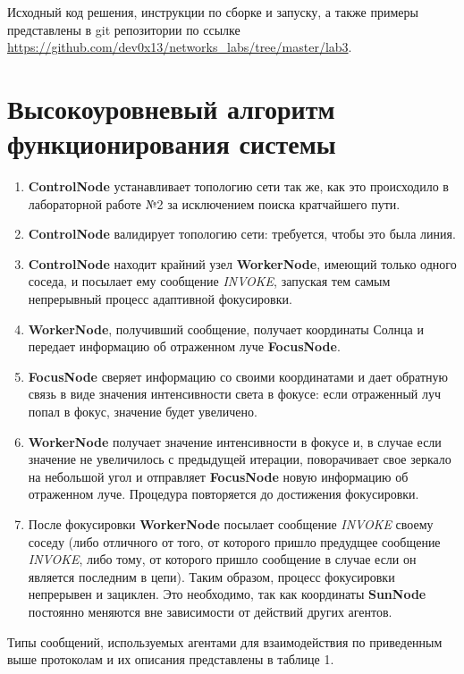 \documentclass{report}
\begin{document}
Исходный код решения, инструкции по сборке и запуску, а также примеры представлены в git репозитории по ссылке \url{https://github.com/dev0x13/networks_labs/tree/master/lab3}.

\section{Высокоуровневый алгоритм функционирования системы}
\begin{enumerate}
    \item {\bf ControlNode} устанавливает топологию сети так же, как это происходило в лабораторной работе №2 за исключением поиска кратчайшего пути.
    \item {\bf ControlNode} валидирует топологию сети: требуется, чтобы это была линия.
    \item {\bf ControlNode} находит крайний узел {\bf WorkerNode}, имеющий только одного соседа, и посылает ему сообщение {\it INVOKE}, запуская тем самым непрерывный процесс адаптивной фокусировки.
    \item {\bf WorkerNode}, получивший сообщение, получает координаты Солнца и передает информацию об отраженном луче {\bf FocusNode}.
    \item {\bf FocusNode} сверяет информацию со своими координатами и дает обратную связь в виде значения интенсивности света в фокусе: если отраженный луч попал в фокус, значение будет увеличено.
    \item {\bf WorkerNode} получает значение интенсивности в фокусе и, в случае если значение не увеличилось с предыдущей итерации, поворачивает свое зеркало на небольшой угол и отправляет {\bf FocusNode} новую информацию об отраженном луче. Процедура повторяется до достижения фокусировки.
    \item После фокусировки {\bf WorkerNode} посылает сообщение {\it INVOKE} своему соседу (либо отличного от того, от которого пришло предудщее сообщение {\it INVOKE}, либо тому, от которого пришло сообщение в случае если он является последним в цепи). Таким образом, процесс фокусировки непрерывен и зациклен. Это необходимо, так как координаты {\bf SunNode} постоянно меняются вне зависимости от действий других агентов.
\end{enumerate}
Типы сообщений, используемых агентами для взаимодействия по приведенным выше протоколам и их описания представлены в таблице 1.
\end{document}
